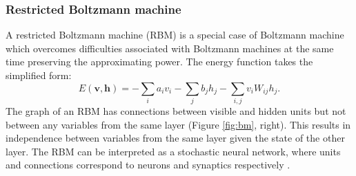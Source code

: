 \documentclass[../report/report.tex]{subfiles}
\begin{document}
\subsubsection{Restricted Boltzmann machine}
A restricted Boltzmann machine (RBM) is a special case of Boltzmann machine which overcomes difficulties associated with Boltzmann machines at the same time preserving the approximating power. The energy function takes the simplified form:
$$ E (\mathbf{v,h}) = - \sum_i a_i v_i - \sum_j b_j h_j - \sum_{i,j} v_i W_{ij}h_j.$$
The graph of an RBM has connections between visible and hidden units but not between any variables from the same layer (Figure \ref{fig:bm}, right). This results in independence between variables from the same layer given the state of the other layer. The RBM can be interpreted as a stochastic neural network, where units and connections correspond to neurons and synaptics respectively \cite{fischer2012introduction}.
\end{document}
